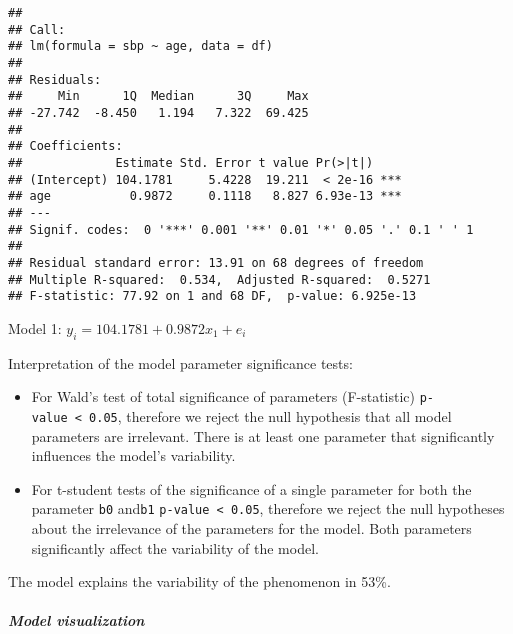 \documentclass[
]{article}
\newenvironment{Shaded}{\begin{snugshade}}{\end{snugshade}}
\newcommand{\AttributeTok}[1]{\textcolor[rgb]{0.77,0.63,0.00}{#1}}
\newcommand{\FunctionTok}[1]{\textcolor[rgb]{0.00,0.00,0.00}{#1}}
\newcommand{\NormalTok}[1]{#1}
\newcommand{\OtherTok}[1]{\textcolor[rgb]{0.56,0.35,0.01}{#1}}
\newcommand{\SpecialCharTok}[1]{\textcolor[rgb]{0.00,0.00,0.00}{#1}}
\newcommand{\StringTok}[1]{\textcolor[rgb]{0.31,0.60,0.02}{#1}}
\begin{document}
\begin{verbatim}
## 
## Call:
## lm(formula = sbp ~ age, data = df)
## 
## Residuals:
##     Min      1Q  Median      3Q     Max 
## -27.742  -8.450   1.194   7.322  69.425 
## 
## Coefficients:
##             Estimate Std. Error t value Pr(>|t|)    
## (Intercept) 104.1781     5.4228  19.211  < 2e-16 ***
## age           0.9872     0.1118   8.827 6.93e-13 ***
## ---
## Signif. codes:  0 '***' 0.001 '**' 0.01 '*' 0.05 '.' 0.1 ' ' 1
## 
## Residual standard error: 13.91 on 68 degrees of freedom
## Multiple R-squared:  0.534,  Adjusted R-squared:  0.5271 
## F-statistic: 77.92 on 1 and 68 DF,  p-value: 6.925e-13
\end{verbatim}

Model 1: \(y_{i} = 104.1781 + 0.9872x_{1} + e_{i}\)

Interpretation of the model parameter significance tests:

\begin{itemize}
\item
  For Wald's test of total significance of parameters (F-statistic)
  \texttt{p-value\ \textless{}\ 0.05}, therefore we reject the null
  hypothesis that all model parameters are irrelevant. There is at least
  one parameter that significantly influences the model's variability.
\item
  For t-student tests of the significance of a single parameter for both
  the parameter \texttt{b0} and\texttt{b1}
  \texttt{p-value\ \textless{}\ 0.05}, therefore we reject the null
  hypotheses about the irrelevance of the parameters for the model. Both
  parameters significantly affect the variability of the model.
\end{itemize}

The model explains the variability of the phenomenon in 53\%.

\hypertarget{model-visualization}{%
\subparagraph{Model visualization}\label{model-visualization}}

\begin{Shaded}
\end{Shaded}
\end{document}
